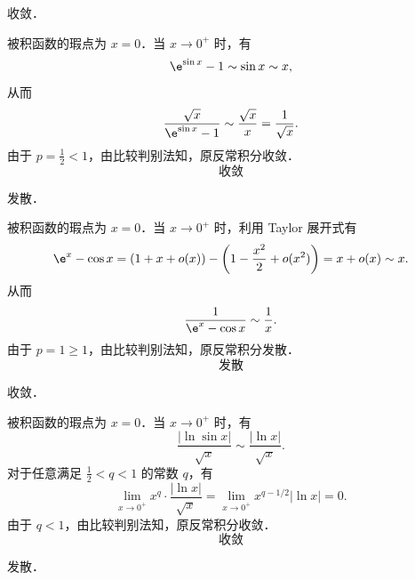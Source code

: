 \begin{solution}
     收敛．

    被积函数的瑕点为 $x = 0$．当 $x \to 0^+$ 时，有
    \begin{equation}
        \e^{\sin x} - 1 \sim \sin x \sim x,
    \end{equation}
    从而
    \begin{equation}
        \frac{\sqrt{x}}{\e^{\sin x} - 1} \sim \frac{\sqrt{x}}{x} = \frac{1}{\sqrt{x}}.
    \end{equation}
    由于 $p = \frac{1}{2} < 1$，由比较判别法知，原反常积分收敛．
    \begin{equation}
        \boxed{\text{收敛}}
    \end{equation}

     发散．

    被积函数的瑕点为 $x = 0$．当 $x \to 0^+$ 时，利用 Taylor 展开式有
    \begin{equation}
        \e^x - \cos x = (1 + x + o(x)) - \left( 1 - \frac{x^2}{2} + o(x^2) \right) = x + o(x) \sim x.
    \end{equation}
    从而
    \begin{equation}
        \frac{1}{\e^x - \cos x} \sim \frac{1}{x}.
    \end{equation}
    由于 $p = 1 \geqslant 1$，由比较判别法知，原反常积分发散．
    \begin{equation}
        \boxed{\text{发散}}
    \end{equation}

     收敛．

    被积函数的瑕点为 $x = 0$．当 $x \to 0^+$ 时，有
    \begin{equation}
        \frac{|\ln \sin x|}{\sqrt{x}} \sim \frac{|\ln x|}{\sqrt{x}}.
    \end{equation}
    对于任意满足 $\frac{1}{2} < q < 1$ 的常数 $q$，有
    \begin{equation}
        \lim_{x \to 0^+} x^q \cdot \frac{|\ln x|}{\sqrt{x}} = \lim_{x \to 0^+} x^{q - 1/2} |\ln x| = 0.
    \end{equation}
    由于 $q < 1$，由比较判别法知，原反常积分收敛．
    \begin{equation}
        \boxed{\text{收敛}}
    \end{equation}

     发散．


\end{solution}
